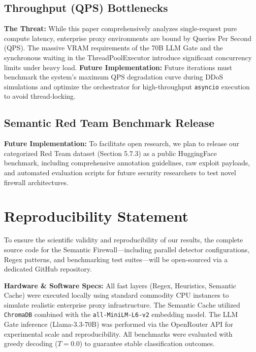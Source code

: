 \documentclass[12pt,a4paper]{article}
\begin{document}
\subsection{Throughput (QPS) Bottlenecks}
\textbf{The Threat:} While this paper comprehensively analyzes single-request pure compute latency, enterprise proxy environments are bound by Queries Per Second (QPS). The massive VRAM requirements of the 70B LLM Gate and the synchronous waiting in the ThreadPoolExecutor introduce significant concurrency limits under heavy load.
\textbf{Future Implementation:} Future iterations must benchmark the system's maximum QPS degradation curve during DDoS simulations and optimize the orchestrator for high-throughput \texttt{asyncio} execution to avoid thread-locking.

\subsection{Semantic Red Team Benchmark Release}
\textbf{Future Implementation:} To facilitate open research, we plan to release our categorized Red Team dataset (Section 5.7.3) as a public HuggingFace benchmark, including comprehensive annotation guidelines, raw exploit payloads, and automated evaluation scripts for future security researchers to test novel firewall architectures.

\section{Reproducibility Statement}

To ensure the scientific validity and reproducibility of our results, the complete source code for the Semantic Firewall---including parallel detector configurations, Regex patterns, and benchmarking test suites---will be open-sourced via a dedicated GitHub repository. 

\textbf{Hardware \& Software Specs:}
All fast layers (Regex, Heuristics, Semantic Cache) were executed locally using standard commodity CPU instances to simulate realistic enterprise proxy infrastructure. The Semantic Cache utilized \texttt{ChromaDB} combined with the \texttt{all-MiniLM-L6-v2} embedding model. The LLM Gate inference (Llama-3.3-70B) was performed via the OpenRouter API for experimental scale and reproducibility. All benchmarks were evaluated with greedy decoding ($T{=}0.0$) to guarantee stable classification outcomes.
\end{document}

